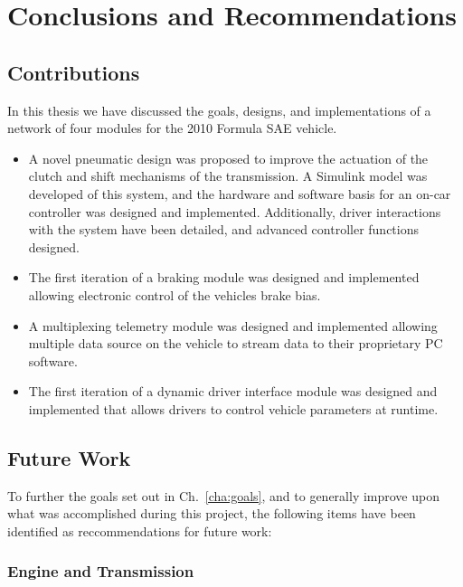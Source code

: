 \chapter{Conclusions and Recommendations}

\section{Contributions}

In this thesis we have discussed the goals, designs, and implementations of a network of four modules for the 2010 Formula SAE vehicle.

\begin{itemize}
  \item A novel pneumatic design was proposed to improve the actuation of the clutch and shift mechanisms of the transmission. A Simulink model was developed of this system, and the hardware and software basis for an on-car controller was designed and implemented. Additionally, driver interactions with the system have been detailed, and advanced controller functions designed.

  \item The first iteration of a braking module was designed and implemented allowing electronic control of the vehicles brake bias.

  \item A multiplexing telemetry module was designed and implemented allowing multiple data source on the vehicle to stream data to their proprietary PC software.

  \item The first iteration of a dynamic driver interface module was designed and implemented that allows drivers to control vehicle parameters at runtime.
\end{itemize}

\section{Future Work}

To further the goals set out in Ch.\ \ref{cha:goals}, and to generally improve upon what was accomplished during this project, the following items have been identified as reccommendations for future work:

\subsection{Engine and Transmission}


